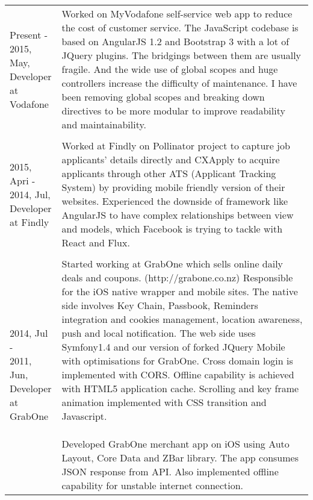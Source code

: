 \begin{resume}
\begin{tabular}{ll}
\parbox[t]{30mm}{Present - \\ 2015, May,\\Developer\\at Vodafone} & \parbox[t]{116mm}{

Worked on MyVodafone self-service web app to reduce the cost of customer service. The JavaScript codebase is based on AngularJS 1.2 and Bootstrap 3 with a lot of JQuery plugins. The bridgings between them are usually fragile. And the wide use of global scopes and huge controllers increase the difficulty of maintenance. I have been removing global scopes and breaking down directives to be more modular to improve readability and maintainability. 

}\\\\
\parbox[t]{30mm}{2015, Apri - \\ 2014, Jul,\\Developer\\at Findly} & \parbox[t]{116mm}{

Worked at Findly on Pollinator project to capture job applicants' details directly and CXApply to acquire applicants through other ATS (Applicant Tracking System) by providing mobile friendly version of their websites. Experienced the downside of framework like AngularJS to have complex relationships between view and models, which Facebook is trying to tackle with React and Flux.

}\\\\
\parbox[t]{30mm}{2014, Jul - \\ 2011, Jun,\\Developer\\at GrabOne} & \parbox[t]{116mm}{

Started working at GrabOne which sells online daily deals and coupons. (http://grabone.co.nz) Responsible for the iOS native wrapper and mobile sites. The native side involves Key Chain, Passbook, Reminders integration and cookies management, location awareness, push and local notification. The web side uses Symfony1.4 and our version of forked JQuery Mobile with optimisations for GrabOne. Cross domain login is implemented with CORS. Offline capability is achieved with HTML5 application cache. Scrolling and key frame animation implemented with CSS transition and Javascript. 
\\\\
Developed GrabOne merchant app on iOS using Auto Layout, Core Data and ZBar library. The app consumes JSON response from API. Also implemented offline capability for unstable internet connection.

}
\end{tabular}
\end{resume}
